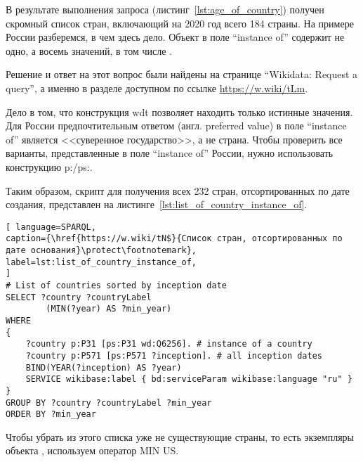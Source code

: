 
В результате выполнения запроса (листинг~\ref{lst:age_of_country}) получен скромный список стран, включающий на 2020 год всего 184 страны. На примере России разберемся, в чем здесь дело. Объект  в поле ``instance of'' содержит не одно, а восемь значений, в том числе .


Решение и ответ на этот вопрос были найдены на странице ``Wikidata: Request a query'', а именно в разделе доступном по ссылке \href{https://w.wiki/tLm}{https://w.wiki/tLm}.

Дело в том, что конструкция wdt позволяет находить только истинные значения. Для России предпочтительным ответом (англ. preferred value) в поле ``instance of'' является <<суверенное государство>>, а не страна. Чтобы проверить все варианты, представленные в поле ``instance of'' России, нужно использовать конструкцию p:/ps:.

Таким образом, скрипт для получения всех 232 стран, отсортированных по дате создания, представлен на листинге~\ref{lst:list_of_country_instance_of}.

\begin{lstlisting}[ language=SPARQL, 
caption={\href{https://w.wiki/tN$}{Список стран, отсортированных по дате основания}\protect\footnotemark},
label=lst:list_of_country_instance_of, 
]
# List of countries sorted by inception date
SELECT ?country ?countryLabel
		(MIN(?year) AS ?min_year)
WHERE
{
	?country p:P31 [ps:P31 wd:Q6256]. # instance of a country 
	?country p:P571 [ps:P571 ?inception]. # all inception dates
	BIND(YEAR(?inception) AS ?year)
	SERVICE wikibase:label { bd:serviceParam wikibase:language "ru" }
}
GROUP BY ?country ?countryLabel ?min_year
ORDER BY ?min_year
\end{lstlisting}


Чтобы убрать из этого списка уже не существующие страны, то есть экземпляры объекта , используем оператор MIN US.

